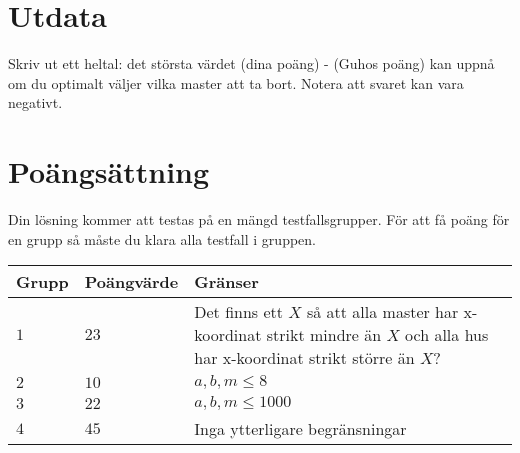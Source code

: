 \section*{Utdata}
Skriv ut ett heltal: det största värdet (dina poäng) - (Guhos poäng) kan uppnå om du optimalt väljer vilka master att ta bort. Notera att svaret kan vara negativt.

\section*{Poängsättning}
Din lösning kommer att testas på en mängd testfallsgrupper.
För att få poäng för en grupp så måste du klara alla testfall i gruppen.

\noindent
\begin{tabular}{| l | l | p{12cm} |}
  \hline
  Grupp & Poängvärde & Gränser \\ \hline
  $1$   & $23$       & Det finns ett $X$ så att alla master har x-koordinat strikt mindre än $X$ och alla hus har x-koordinat strikt större än $X$? \\ \hline
  $2$   & $10$       & $a,b,m \leq 8$\\ \hline
  $3$   & $22$       & $a,b,m \leq 1000$  \\ \hline
  $4$   & $45$       & Inga ytterligare begränsningar  \\ \hline
\end{tabular}
